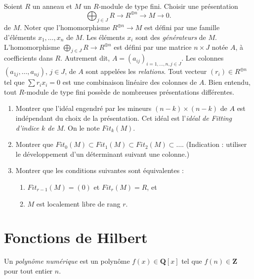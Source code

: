 \begin{exercise}
\label{exercise-fitting}
Soient $R$ un anneau et $M$ un $R$-module de type fini.
Choisir une présentation
$$
\bigoplus\nolimits_{j \in J} R \longrightarrow R^{\oplus n}
\longrightarrow M \longrightarrow 0.
$$
de $M$. Noter que l'homomorphisme $R^{\oplus n} \to M$ est défini par une famille
d'éléments $x_1, \ldots, x_n$ de $M$. Les éléments $x_i$
sont des {\it générateurs} de $M$. L'homomorphisme $\bigoplus_{j \in J} R \to R^{\oplus n}$
est défini par une matrice $n \times J$ notée $A$, à coefficients dans $R$.
Autrement dit, $A = (a_{ij})_{i = 1, \ldots, n, j \in J}$.
Les colonnes $(a_{1j}, \ldots, a_{nj})$, $j \in J$, de $A$
sont appelées les {\it relations}. Tout vecteur $(r_i) \in R^{\oplus n}$
tel que $\sum r_i x_i = 0$ est une combinaison linéaire des colonnes de $A$.
Bien entendu, tout $R$-module de type fini possède de nombreuses présentations différentes.
\begin{enumerate}
\item Montrer que l'idéal engendré par les mineurs $(n - k) \times (n - k)$ de
$A$ est indépendant du choix de la présentation.
Cet idéal est l'{\it idéal de Fitting d'indice $k$ de $M$}. On le note $Fit_k(M)$.
\item Montrer que
$Fit_0(M) \subset Fit_1(M) \subset Fit_2(M) \subset \ldots$.
(Indication : utiliser le développement d'un déterminant suivant une colonne.)
\item Montrer que les conditions suivantes sont équivalentes :
\begin{enumerate}
\item $Fit_{r - 1}(M) = (0)$ et $Fit_r(M) = R$, et
\item $M$ est localement libre de rang $r$.
\end{enumerate}
\end{enumerate}
\end{exercise}




\section{Fonctions de Hilbert}
\label{section-hilbert}

\begin{definition}
\label{definition-numerical-polynomial}
Un {\it polynôme numérique} est un polynôme $f(x) \in {\mathbf Q}[x]$
tel que $f(n) \in {\mathbf Z}$ pour tout entier $n$.
\end{definition}

